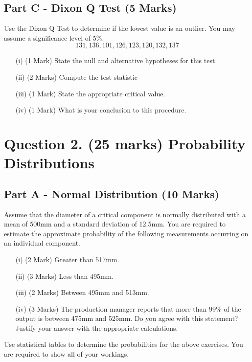 \documentclass[a4paper,12pt]{article}
\begin{document}
\newpage

\subsection*{Part C - Dixon Q Test (5 Marks)}


Use the Dixon Q Test to determine if the lowest value is an outlier. You may assume a significance level of 5\%.
	\[ 131, 136, 101, 126, 123, 120, 132, 137\]
\begin{itemize}
	\item[(i)](1 Mark)	State the null and alternative hypotheses for this test.
	\item[(ii)](2 Marks) Compute the test statistic
	\item[(iii)](1 Mark) State the appropriate critical value.
	\item[(iv)](1 Mark) What is your conclusion to this procedure.
\end{itemize}	


\section*{Question 2. (25 marks) Probability Distributions }

\subsection*{Part A - Normal Distribution (10 Marks)}

\smallskip	
\noindent Assume that the diameter of a critical component is normally distributed with a mean of 500mm and a standard deviation of 12.5mm. You are required  to estimate the approximate probability of the following measurements occurring on an individual component.
\begin{itemize}
	\item[(i)](2 Mark) Greater than 517mm.
	\item[(ii)](3 Marks) Less than 495mm.
	\item [(iii)](2 Marks) Between 495mm and 513mm.
		\item[(iv)] (3 Marks) The production manager reports that more than 99\% of the output is between 475mm and 525mm. Do you agree with this statement? Justify your answer with the appropriate calculations.
\end{itemize}
\medskip
\noindent Use statistical tables to determine the probabilities for the above exercises. You are required to show all of your workings.
\end{document}
